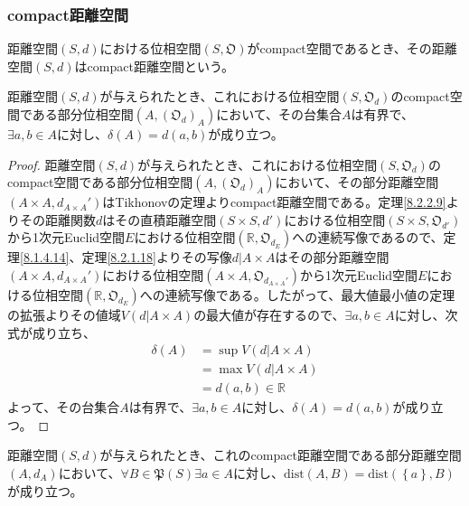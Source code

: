 \documentclass[dvipdfmx]{jsarticle}
\begin{document}
\subsubsection{compact距離空間}%
\begin{dfn}
距離空間$(S,d)$における位相空間$\left( S,\mathfrak{O} \right)$がcompact空間であるとき、その距離空間$(S,d)$はcompact距離空間という。
\end{dfn}
\begin{thm}\label{8.2.5.6}
距離空間$(S,d)$が与えられたとき、これにおける位相空間$\left( S,\mathfrak{O}_{d} \right)$のcompact空間である部分位相空間$\left( A,\left( \mathfrak{O}_{d} \right)_{A} \right)$において、その台集合$A$は有界で、$\exists a,b \in A$に対し、$\delta(A) = d(a,b)$が成り立つ。
\end{thm}
\begin{proof}
距離空間$(S,d)$が与えられたとき、これにおける位相空間$\left( S,\mathfrak{O}_{d} \right)$のcompact空間である部分位相空間$\left( A,\left( \mathfrak{O}_{d} \right)_{A} \right)$において、その部分距離空間$\left( A \times A,d_{A \times A}' \right)$はTikhonovの定理よりcompact距離空間である。定理\ref{8.2.2.9}よりその距離関数$d$はその直積距離空間$\left( S \times S,d' \right)$における位相空間$\left( S \times S,\mathfrak{O}_{d'} \right)$から1次元Euclid空間$E$における位相空間$\left( \mathbb{R},\mathfrak{O}_{d_{E}} \right)$への連続写像であるので、定理\ref{8.1.4.14}、定理\ref{8.2.1.18}よりその写像$d|A \times A$はその部分距離空間$\left( A \times A,d_{A \times A}' \right)$における位相空間$\left( A \times A,\mathfrak{O}_{d_{A \times A}'} \right)$から1次元Euclid空間$E$における位相空間$\left( \mathbb{R},\mathfrak{O}_{d_{E}} \right)$への連続写像である。したがって、最大値最小値の定理の拡張よりその値域$V\left( d|A \times A \right)$の最大値が存在するので、$\exists a,b \in A$に対し、次式が成り立ち、
\begin{align*}
\delta(A) &= \sup{V\left( d|A \times A \right)}\\
&= \max{V\left( d|A \times A \right)}\\
&= d(a,b) \in \mathbb{R}
\end{align*}
よって、その台集合$A$は有界で、$\exists a,b \in A$に対し、$\delta(A) = d(a,b)$が成り立つ。
\end{proof}
\begin{thm}\label{8.2.5.7}
距離空間$(S,d)$が与えられたとき、これのcompact距離空間である部分距離空間$\left( A,d_{A} \right)$において、$\forall B \in \mathfrak{P}(S)\exists a \in A$に対し、$\mathrm{dist}(A,B) = \mathrm{dist}\left( \left\{ a \right\},B \right)$が成り立つ。
\end{thm}
\end{document}
